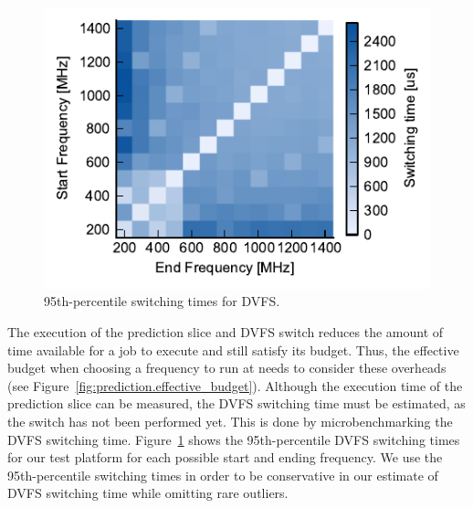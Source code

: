 \begin{figure}
  \begin{center}
    \includegraphics{exec_time_prediction/data/dvfs_heatmap.pdf}
    \caption{95th-percentile switching times for DVFS.}
    \label{fig:prediction.dvfs_heatmap}
  \end{center}
\end{figure}

The execution of the prediction slice and DVFS switch
reduces the amount of time available for a job to execute and still satisfy its
budget. Thus, the effective budget when choosing a frequency to run at
needs to consider these overheads (see
Figure~\ref{fig:prediction.effective_budget}). Although the execution time of
the prediction slice can be measured, the DVFS switching time must be
estimated, as the switch has not been performed yet.  This is done by
microbenchmarking the DVFS switching time.
Figure~\ref{fig:prediction.dvfs_heatmap} shows the 95th-percentile DVFS
switching times for our test platform for each possible start and ending
frequency. We use the 95th-percentile switching times in order to be
conservative in our estimate of DVFS switching time while omitting rare
outliers. 


